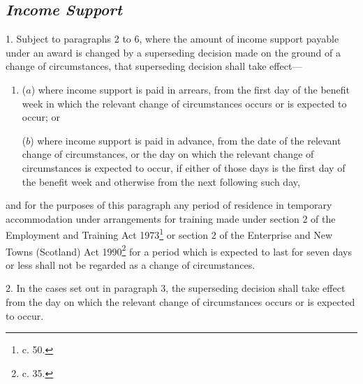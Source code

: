\documentclass[12pt,a4paper]{article}
\begin{document}
\renewcommand\parthead{--- Schedule 3A}


\subsection*{\itshape Income Support}

1.  Subject to paragraphs 2 to 6, where the amount of income support payable under an award is changed by a superseding decision made on the ground of a change of circumstances, that superseding decision shall take effect—
\begin{enumerate}\item[]
($a$) where income support is paid in arrears, from the first day of the benefit week in which the relevant change of circumstances occurs or is expected to occur; or

($b$) where income support is paid in advance, from the date of the relevant change of circumstances, or the day on which the relevant change of circumstances is expected to occur, if either of those days is the first day of the benefit week and otherwise from the next following such day,
\end{enumerate}
and for the purposes of this paragraph any period of residence in temporary accommodation under arrangements for training made under section 2 of the Employment and Training Act 1973\footnote{ c. 50.} or section 2 of the Enterprise and New Towns (Scotland) Act 1990\footnote{ c. 35.} for a period which is expected to last for seven days or less shall not be regarded as a change of circumstances.

\medskip

2.  In the cases set out in paragraph 3, the superseding decision shall take effect from the day on which the relevant change of circumstances occurs or is expected to occur.

\medskip
\end{document}
